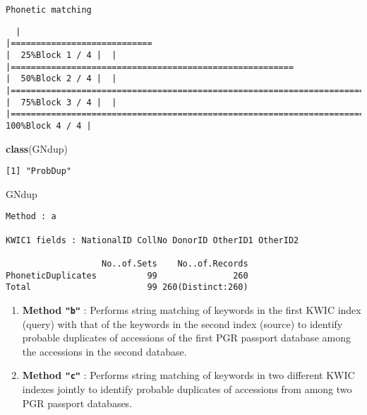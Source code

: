 \documentclass[
]{article}
\newenvironment{Shaded}{\begin{snugshade}}{\end{snugshade}}
\newcommand{\KeywordTok}[1]{\textcolor[rgb]{0.13,0.29,0.53}{\textbf{#1}}}
\newcommand{\NormalTok}[1]{#1}
\begin{document}
\begin{verbatim}
Phonetic matching
\end{verbatim}

\begin{verbatim}
  |                                                                                                                       |============================                                                                                   |  25%Block 1 / 4 |  |                                                                                                                       |========================================================                                                       |  50%Block 2 / 4 |  |                                                                                                                       |===================================================================================                            |  75%Block 3 / 4 |  |                                                                                                                       |===============================================================================================================| 100%Block 4 / 4 |
\end{verbatim}

\begin{Shaded}
\begin{Highlighting}[]
\KeywordTok{class}\NormalTok{(GNdup)}
\end{Highlighting}
\end{Shaded}

\begin{verbatim}
[1] "ProbDup"
\end{verbatim}

\begin{Shaded}
\begin{Highlighting}[]
\NormalTok{GNdup}
\end{Highlighting}
\end{Shaded}

\begin{verbatim}
Method : a

KWIC1 fields : NationalID CollNo DonorID OtherID1 OtherID2
 
                   No..of.Sets    No..of.Records
PhoneticDuplicates          99               260
Total                       99 260(Distinct:260)
\end{verbatim}

\begin{enumerate}
\def\labelenumi{\arabic{enumi}.}
\setcounter{enumi}{1}
\item
  \textbf{Method \texttt{"b"}} : Performs string matching of keywords in
  the first KWIC index (query) with that of the keywords in the second
  index (source) to identify probable duplicates of accessions of the
  first PGR passport database among the accessions in the second
  database.
\item
  \textbf{Method \texttt{"c"}} : Performs string matching of keywords in
  two different KWIC indexes jointly to identify probable duplicates of
  accessions from among two PGR passport databases.
\end{enumerate}
\end{document}
